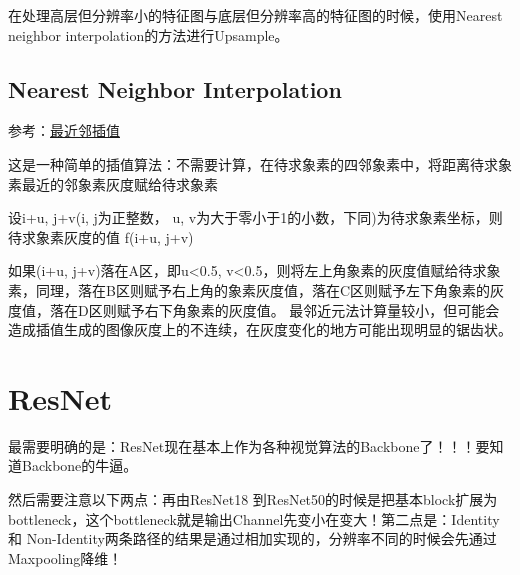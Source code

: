 在处理高层但分辨率小的特征图与底层但分辨率高的特征图的时候，使用Nearest neighbor interpolation的方法进行Upsample。

\subsection{Nearest Neighbor Interpolation}

参考：\href{https://blog.csdn.net/linqianbi/article/details/78593724}{最近邻插值}

这是一种简单的插值算法：不需要计算，在待求象素的四邻象素中，将距离待求象素最近的邻象素灰度赋给待求象素

设i+u, j+v(i, j为正整数， u, v为大于零小于1的小数，下同)为待求象素坐标，则待求象素灰度的值 f(i+u, j+v)

如果(i+u, j+v)落在A区，即u<0.5, v<0.5，则将左上角象素的灰度值赋给待求象素，同理，落在B区则赋予右上角的象素灰度值，落在C区则赋予左下角象素的灰度值，落在D区则赋予右下角象素的灰度值。
最邻近元法计算量较小，但可能会造成插值生成的图像灰度上的不连续，在灰度变化的地方可能出现明显的锯齿状。

\section{ResNet}

最需要明确的是：ResNet现在基本上作为各种视觉算法的Backbone了！！！要知道Backbone的牛逼。

然后需要注意以下两点：再由ResNet18 到ResNet50的时候是把基本block扩展为bottleneck，这个bottleneck就是输出Channel先变小在变大！第二点是：Identity 和 Non-Identity两条路径的结果是通过相加实现的，分辨率不同的时候会先通过Maxpooling降维！






